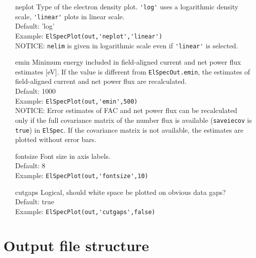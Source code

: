 \documentclass[12pt,a4paper]{report}
\begin{document}
\begin{itemize}
\item[neplot] Type of the electron density plot. \verb|'log'| uses a logarithmic density scale, \verb|'linear'| plots in linear scale. \\
Default: 'log'\\
Example: \verb|ElSpecPlot(out,'neplot','linear')|\\
NOTICE: \verb|nelim| is given in logarithmic scale even if \verb|'linear'| is selected. 

\item[emin] Minimum energy included in field-aligned current and net power flux estimates [eV]. If the value is different from \verb|ElSpecOut.emin|, the estimates of field-aligned current and net power flux are recalculated. \\
Default: 1000\\
Example: \verb|ElSpecPlot(out,'emin',500)|\\
NOTICE: Error estimates of FAC and net power flux can be recalculated only if the full covariance matrix of the number flux is available (\verb|saveiecov| is \verb|true|) in \verb|ElSpec|. If the covariance matrix is not available, the estimates are plotted without error bars. 

\item[fontsize] Font size in axis labels.\\
Default: 8\\
Example: \verb|ElSpecPlot(out,'fontsize',10)| \\

\item[cutgaps] Logical, should white space be plotted on obvious data gaps?\\
Default: true\\
Example: \verb|ElSpecPlot(out,'cutgaps',false)|


\end{itemize}
%
%
%
%
%
%

\chapter{Output file structure}
\end{document}
